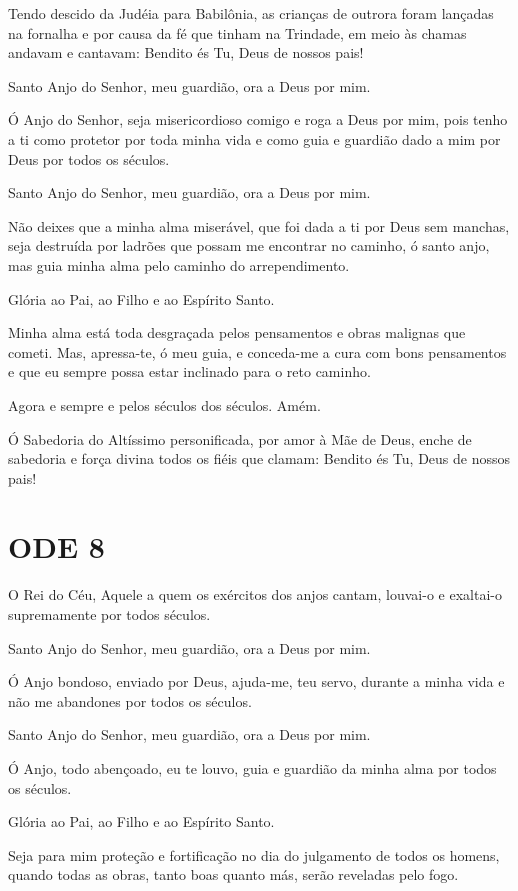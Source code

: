 \documentclass{subfiles}
\begin{document}
\eirmos{}Tendo descido da Judéia para Babilônia, as crianças de outrora foram
lançadas na fornalha e por causa da fé que tinham na Trindade, em meio às
chamas andavam e cantavam: Bendito és Tu, Deus de nossos pais!

Santo Anjo do Senhor, meu guardião, ora a Deus por mim.

Ó Anjo do Senhor, seja misericordioso comigo e roga a Deus por mim,
pois tenho a ti como protetor por toda minha vida e como guia e guardião dado
a mim por Deus por todos os séculos.

Santo Anjo do Senhor, meu guardião, ora a Deus por mim.

Não deixes que a minha alma miserável, que foi dada a ti por Deus sem
manchas, seja destruída por ladrões que possam me encontrar no caminho, ó
santo anjo, mas guia minha alma pelo caminho do arrependimento.

Glória ao Pai, ao Filho e ao Espírito Santo.

Minha alma está toda desgraçada pelos pensamentos e obras malignas
que cometi. Mas, apressa-te, ó meu guia, e conceda-me a cura com bons
pensamentos e que eu sempre possa estar inclinado para o reto caminho.

Agora e sempre e pelos séculos dos séculos. Amém.

Ó Sabedoria do Altíssimo personificada, por amor à Mãe de Deus,
enche de sabedoria e força divina todos os fiéis que clamam: Bendito és Tu,
Deus de nossos pais!

\section*{ODE 8}

\eirmos{}O Rei do Céu, Aquele a quem os exércitos dos anjos cantam, louvai-o e
exaltai-o supremamente por todos séculos.

Santo Anjo do Senhor, meu guardião, ora a Deus por mim.

Ó Anjo bondoso, enviado por Deus, ajuda-me, teu servo, durante a
minha vida e não me abandones por todos os séculos.

Santo Anjo do Senhor, meu guardião, ora a Deus por mim.

Ó Anjo, todo abençoado, eu te louvo, guia e guardião da minha alma
por todos os séculos.

Glória ao Pai, ao Filho e ao Espírito Santo.

Seja para mim proteção e fortificação no dia do julgamento de todos
os homens, quando todas as obras, tanto boas quanto más, serão reveladas
pelo fogo.
\end{document}
